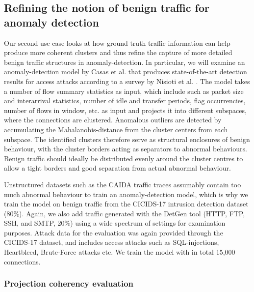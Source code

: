 \documentclass[conference]{IEEEtran}
\begin{document}
\subsection{Refining the notion of benign traffic for anomaly detection}

Our second use-case looks at how ground-truth traffic information can help produce more coherent clusters and thus refine the capture of more detailed benign traffic structures in anomaly-detection. In particular, we will examine an anomaly-detection model by Casas et al. \cite{casas2012unsupervised} that produces state-of-the-art detection results for access attacks according to a survey by Nisioti et al. \cite{nisioti2018intrusion}.
The model takes a number of flow summary statistics as input, which include such as packet size and interarrival statistics, number of idle and transfer periods, flag occurrencies, number of flows in window, etc. as input and projects it into different subspaces, where the connections are clustered. Anomalous outliers are detected by accumulating the Mahalanobis-distance from the cluster centers from each subspace. The identified clusters therefore serve as structural enclosures of benign behaviour, with the cluster borders acting as separators to abnormal behaviours. Benign traffic should ideally be distributed evenly around the cluster centres to allow a tight borders and good separation from actual abnormal behaviour.

Unstructured datasets such as the CAIDA traffic traces assumably contain too much abnormal behaviour to train an anomaly-detection model, which is why we train the model on benign traffic from the CICIDS-17 intrusion detection dataset (80\%). Again, we also add traffic generated with the DetGen tool (HTTP, FTP, SSH, and SMTP, 20\%) using a wide spectrum of settings for examination purposes. Attack data for the evaluation was again provided through the CICIDS-17 dataset, and includes access attacks such as SQL-injections, Heartbleed, Brute-Force attacks etc. We  train the model with in total 15,000 connections.

\subsubsection{Projection coherency evaluation}
\end{document}
